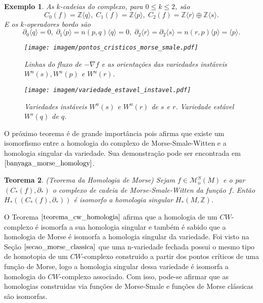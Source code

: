 \documentclass[12pt]{book}
\newtheorem{teorema}{Teorema}[section]
\newtheorem{exemplo}[teorema]{Exemplo}
\newcommand{\bordo}[1]{\partial_{#1}}
\newcommand{\funcoesmorsesmale}[1]{\mathcal{M}^{S}_{o}(#1)}
\newcommand{\gerador}[1]{\langle #1\rangle}
\newcommand{\gradiente}{\nabla f}
\newcommand{\inteiros}{\mathbb{Z}}
\begin{document}
\begin{exemplo}
		As $k$-cadeias do complexo, para $0\leq k\leq 2$, são
		$$
		C_{0}(f) = \inteiros\gerador{q},\; C_{1}(f) = \inteiros\gerador{p},\; C_{2}(f) = \inteiros\gerador{r}\oplus\inteiros\gerador{s}.
		$$
		E os $k$-operadores bordo são
		$$
		\bordo{0}\gerador{q} =0,\; \bordo{1}\gerador{p}=n(p,q)\gerador{q} = 0,\; \bordo{2}\gerador{r}=\bordo{2}\gerador{s} = n(r,p)\gerador{p} = \gerador{p}.
		$$
		
		\begin{figure}[!h]
			\centering
			\texttt{[image: imagem/pontos\_cristicos\_morse\_smale.pdf]}
			\caption{Linhas do fluxo de $-\gradiente$ e as orientações das variedades instáveis $W^{u}(s), W^{u}(p)$ e $W^{u}(r)$.}
			\label{figura_fluxo_morse_smale}
		\end{figure}
		
		
		\begin{figure}[!h]
			\centering
			\texttt{[image: imagem/variedade\_estavel\_instavel.pdf]}
			\caption{Variedades instáveis $W^{u}(s)$ e $W^{u}(r)$ de $s$ e $r$. Variedade estável $W^{s}(q)$ de $q$.}
			\label{figura_variedade_estavel_instavel}
		\end{figure}
	\end{exemplo}

	
	O próximo teorema é de grande importância pois afirma que existe um isomorfismo entre a homologia do complexo de Morse-Smale-Witten e a homologia singular da variedade. Sua demonstração pode ser encontrada em $\cite{banyaga_morse_homology}$.
	
	\begin{teorema}
		(Teorema da Homologia de Morse) Sejam $f \in \funcoesmorsesmale{M}$ e o par $(C_{*}(f), \partial_{*})$ o complexo de cadeia de Morse-Smale-Witten da função $f$. Então $H_{*}((C_{*}(f), \partial_{*})) $ é isomorfo a homologia singular $ H_{*}(M, \inteiros)$.
	\end{teorema}
	
	O Teorema $\ref{teorema_cw_homologia}$ afirma que a homologia de um $CW$-complexo é isomorfa a sua homologia singular e também é sabido que a homologia de Morse é isomorfa a homologia singular da variedade. Foi visto na Seção $\ref{secao_morse_classica}$ que uma n-variedade fechada possui o mesmo tipo de homotopia de um $CW$-complexo construido a partir dos pontos críticos de uma função de Morse, logo a homologia singular dessa variedade é isomorfa a homologia do $CW$-complexo associado. Com isso, pode-se afirmar que as homologias construidas via funções de Morse-Smale e funções de Morse clássicas são isomorfas.
	
\end{document}
